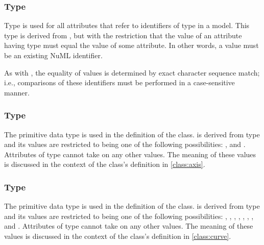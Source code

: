 \subsubsection[\element{NuMLSIdRef}]{Type }
\label{type:numlsidref}
Type  is used for all attributes that refer to identifiers of type \hyperref[type:numlsid]{} in a model. This type is derived from \hyperref[type:numlsid]{}, but with the restriction that the value of an attribute having type  must equal the value of some \hyperref[type:numlsid]{} attribute. In other words, a  value must be an existing NuML identifier.

As with \hyperref[type:numlsid]{}, the equality of  values is determined by exact character sequence match; i.e., comparisons of these identifiers must be performed in a case-sensitive manner.

\begin{blockChanged}
\subsubsection[\element{AxisKind}]{Type }
\label{type:axisKind}

The  primitive data type is used in the definition of the \Axis class.   is derived from type  and its values are restricted to being one of the following possibilities: , and .  Attributes of type  cannot take on any other values.  The meaning of these values is discussed in the context of the \Axis class's definition in \ref{class:axis}.

\subsubsection[\element{CurveKind}]{Type }
\label{type:curveKind}

The  primitive data type is used in the definition of the \Curve class.   is derived from type  and its values are restricted to being one of the following possibilities: , , , , , , , and .  Attributes of type  cannot take on any other values.  The meaning of these values is discussed in the context of the \Curve class's definition in \ref{class:curve}.

\end{blockChanged}


